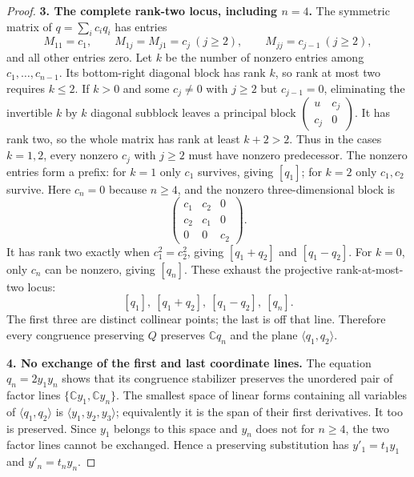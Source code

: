 \begin{proof}
\par\medskip\noindent\textbf{3. The complete rank-two locus, including $n=4$.}\quad 
The symmetric matrix of $q=\sum_i c_iq_i$ has entries
\[
 M_{11}=c_1,\qquad M_{1j}=M_{j1}=c_j\ (j\ge2),\qquad
 M_{jj}=c_{j-1}\ (j\ge2),
\]
and all other entries zero.  Let $k$ be the number of nonzero
entries among $c_1,\ldots,c_{n-1}$.  Its bottom-right diagonal
block has rank $k$, so rank at most two requires $k\le2$.
If $k>0$ and some $c_j\ne0$ with $j\ge2$ but $c_{j-1}=0$,
eliminating the invertible $k$ by $k$ diagonal subblock leaves
a principal block $\left(\begin{smallmatrix}u&c_j\\c_j&0\end{smallmatrix}\right)$.
It has rank two, so the whole matrix has rank at least $k+2>2$.
Thus in the cases $k=1,2$, every nonzero $c_j$ with $j\ge2$
must have nonzero predecessor.  The nonzero entries form a prefix:
for $k=1$ only $c_1$ survives, giving $[q_1]$; for $k=2$ only
$c_1,c_2$ survive.  Here $c_n=0$ because $n\ge4$, and the
nonzero three-dimensional block is
\[
 \begin{pmatrix}c_1&c_2&0\\c_2&c_1&0\\0&0&c_2\end{pmatrix}.
\]
It has rank two exactly when $c_1^2=c_2^2$, giving
$[q_1+q_2]$ and $[q_1-q_2]$.
For $k=0$, only $c_n$ can be nonzero, giving $[q_n]$.
These exhaust the projective rank-at-most-two locus:
\[
                 [q_1],\ [q_1+q_2],\ [q_1-q_2],\ [q_n]. \tag{P-F65d}
\]
The first three are distinct collinear points; the last is off
that line.  Therefore every congruence preserving $Q$ preserves
$\mathbb Cq_n$ and the plane $\langle q_1,q_2\rangle$.

\par\medskip\noindent\textbf{4. No exchange of the first and last coordinate lines.}\quad 
The equation $q_n=2y_1y_n$ shows that its congruence stabilizer
preserves the unordered pair of factor lines
$\{\mathbb Cy_1,\mathbb Cy_n\}$.
The smallest space of linear forms containing all variables of
$\langle q_1,q_2\rangle$ is $\langle y_1,y_2,y_3\rangle$;
equivalently it is the span of their first derivatives.  It too
is preserved.  Since $y_1$ belongs to this space and $y_n$ does
not for $n\ge4$, the two factor lines cannot be exchanged.
Hence a preserving substitution has $y'_1=t_1y_1$ and
$y'_n=t_ny_n$.


\end{proof}
